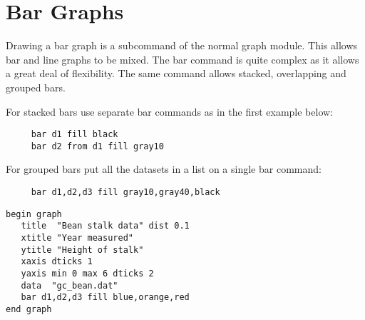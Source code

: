 \section{Bar Graphs}
Drawing a bar graph is a subcommand of the normal graph module. This allows
bar and line graphs to be mixed.
The bar command is quite complex as it allows a
great deal of flexibility.  The same command allows stacked, overlapping and
grouped bars.

For stacked bars use separate bar commands as in the first
example below:

\preglecode{}
\begin{Verbatim}
     bar d1 fill black
     bar d2 from d1 fill gray10
\end{Verbatim}
\postglecode{}

For grouped bars put all the datasets in a list on a single bar
command:

\preglecode{}
\begin{Verbatim}
     bar d1,d2,d3 fill gray10,gray40,black
\end{Verbatim}
\postglecode{}

\begin{minipage}[c]{8cm}
\begin{Verbatim}
begin graph
   title  "Bean stalk data" dist 0.1
   xtitle "Year measured"
   ytitle "Height of stalk"
   xaxis dticks 1
   yaxis min 0 max 6 dticks 2
   data  "gc_bean.dat"
   bar d1,d2,d3 fill blue,orange,red
end graph
\end{Verbatim}
\end{minipage}
\hfill
\begin{minipage}[c]{7cm}
\mbox{}
\end{minipage}


